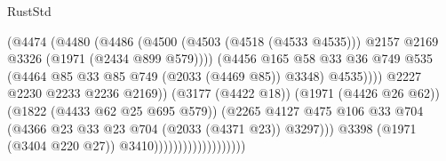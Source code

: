 \begin{lexlean}{RustStd}
\begin{coremodule}
                                                  (@4474
                                                    (@4480
                                                      (@4486
                                                        (@4500
                                                          (@4503 (@4518 (@4533 @4535)))
                                                          @2157
                                                          @2169
                                                          @3326
                                                          (@1971 (@2434 @899 @579))))
                                                      (@4456
                                                        @165
                                                        @58
                                                        @33
                                                        @36
                                                        @749
                                                        @535
                                                        (@4464
                                                          @85
                                                          @33
                                                          @85
                                                          @749
                                                          (@2033 (@4469 @85))
                                                          @3348)
                                                        @4535))))
                                                @2227
                                                @2230
                                                @2233
                                                @2236
                                                @2169))
                                            (@3177 (@4422 @18))
                                            (@1971 (@4426 @26 @62))
                                            (@1822 (@4433 @62 @25 @695 @579))
                                            (@2265
                                              @4127
                                              @475
                                              @106
                                              @33
                                              @704
                                              (@4366 @23 @33 @23 @704 (@2033 (@4371 @23)) @3297)))
                                          @3398
                                          (@1971 (@3404 @220 @27))
                                          @3410)))))))))))))))))))

\end{coremodule}
\end{lexlean}
